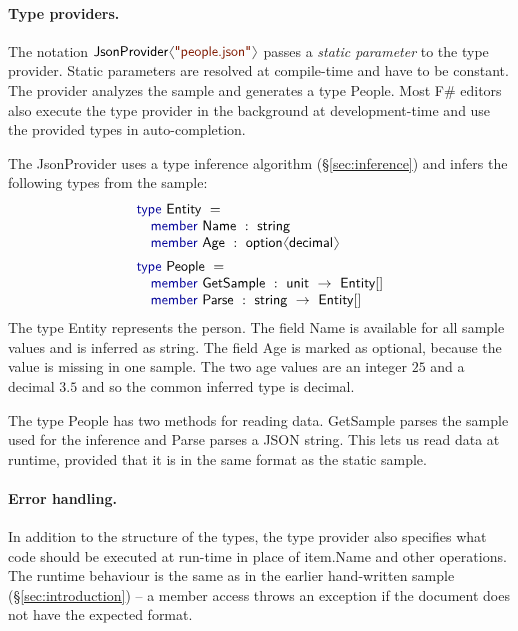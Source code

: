\documentclass[10pt,preprint,blind,clearpagebib]{sigplanconf}
\newcommand{\langl}{\begin{picture}(4.5,7)
\put(1.1,2.5){\rotatebox{60}{\line(1,0){5.5}}}
\put(1.1,2.5){\rotatebox{300}{\line(1,0){5.5}}}
\end{picture}}
\newcommand{\rangl}{\begin{picture}(4.5,7)
\put(.9,2.5){\rotatebox{120}{\line(1,0){5.5}}}
\put(.9,2.5){\rotatebox{240}{\line(1,0){5.5}}}
\end{picture}}
\newcommand{\kvd}[1]{\textnormal{\textcolor{kvdclr}{\sffamily #1}}}
\newcommand{\str}[1]{\textnormal{\textcolor{strclr}{\sffamily "#1"}}}
\newcommand{\ident}[1]{\textnormal{\sffamily #1}}
\begin{document}
\paragraph{Type providers.}
The notation $\ident{JsonProvider}\langl\str{people.json}\rangl$ passes a \emph{static parameter} 
to the type provider. Static parameters are resolved at compile-time and have to be constant. 
The provider analyzes the sample and generates a type  \ident{People}. Most F\# editors also 
execute the type provider in the background at development-time and use the provided types 
in auto-completion.

The \ident{JsonProvider} uses a type inference algorithm (\S\ref{sec:inference})  and
infers the following types from the sample:
%
\begin{equation*}
\begin{array}{l}
 \kvd{type}~\ident{Entity}~=  \\
 \quad \kvd{member}~\ident{Name}~:~\ident{string} \\
 \quad \kvd{member}~\ident{Age}~:~\ident{option}\langl \ident{decimal}\rangl \\[0.5em]
 \kvd{type}~\ident{People}~=  \\
 \quad \kvd{member}~\ident{GetSample}~:~\ident{unit}~\rightarrow~\ident{Entity}[] \\
 \quad \kvd{member}~\ident{Parse}~:~\ident{string}~\rightarrow~\ident{Entity}[] \\
\end{array}
\end{equation*}
%
The type \ident{Entity} represents the person. The field \ident{Name} is available for all
sample values and is inferred as \ident{string}. The field \ident{Age} is marked as optional,
because the value is missing in one sample. The two age values are an integer $25$ and a 
decimal $3.5$ and so the common inferred type is \ident{decimal}.

The type \ident{People} has two methods for reading data. \ident{GetSample} parses the
sample used for the inference and \ident{Parse} parses a JSON string. This lets us read
data at runtime, provided that it is in the same format as the static sample.

\paragraph{Error handling.}
In addition to the structure of the types, the type provider also specifies what code should be 
executed at run-time in place of \ident{item.Name} and other operations. The runtime behaviour is 
the same as in the earlier hand-written sample (\S\ref{sec:introduction}) -- a member access 
throws an exception if the document does not have the expected format.
\end{document}
